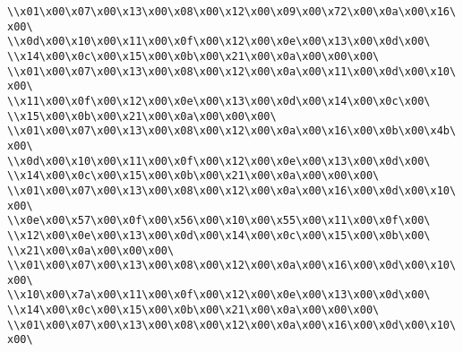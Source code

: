 \verb|\\x01\x00\x07\x00\x13\x00\x08\x00\x12\x00\x09\x00\x72\x00\x0a\x00\x16\x00\|\newline
\verb|\\x0d\x00\x10\x00\x11\x00\x0f\x00\x12\x00\x0e\x00\x13\x00\x0d\x00\|\newline
\verb|\\x14\x00\x0c\x00\x15\x00\x0b\x00\x21\x00\x0a\x00\x00\x00\|\newline
\verb|\\x01\x00\x07\x00\x13\x00\x08\x00\x12\x00\x0a\x00\x11\x00\x0d\x00\x10\x00\|\newline
\verb|\\x11\x00\x0f\x00\x12\x00\x0e\x00\x13\x00\x0d\x00\x14\x00\x0c\x00\|\newline
\verb|\\x15\x00\x0b\x00\x21\x00\x0a\x00\x00\x00\|\newline
\verb|\\x01\x00\x07\x00\x13\x00\x08\x00\x12\x00\x0a\x00\x16\x00\x0b\x00\x4b\x00\|\newline
\verb|\\x0d\x00\x10\x00\x11\x00\x0f\x00\x12\x00\x0e\x00\x13\x00\x0d\x00\|\newline
\verb|\\x14\x00\x0c\x00\x15\x00\x0b\x00\x21\x00\x0a\x00\x00\x00\|\newline
\verb|\\x01\x00\x07\x00\x13\x00\x08\x00\x12\x00\x0a\x00\x16\x00\x0d\x00\x10\x00\|\newline
\verb|\\x0e\x00\x57\x00\x0f\x00\x56\x00\x10\x00\x55\x00\x11\x00\x0f\x00\|\newline
\verb|\\x12\x00\x0e\x00\x13\x00\x0d\x00\x14\x00\x0c\x00\x15\x00\x0b\x00\|\newline
\verb|\\x21\x00\x0a\x00\x00\x00\|\newline
\verb|\\x01\x00\x07\x00\x13\x00\x08\x00\x12\x00\x0a\x00\x16\x00\x0d\x00\x10\x00\|\newline
\verb|\\x10\x00\x7a\x00\x11\x00\x0f\x00\x12\x00\x0e\x00\x13\x00\x0d\x00\|\newline
\verb|\\x14\x00\x0c\x00\x15\x00\x0b\x00\x21\x00\x0a\x00\x00\x00\|\newline
\verb|\\x01\x00\x07\x00\x13\x00\x08\x00\x12\x00\x0a\x00\x16\x00\x0d\x00\x10\x00\|\newline
